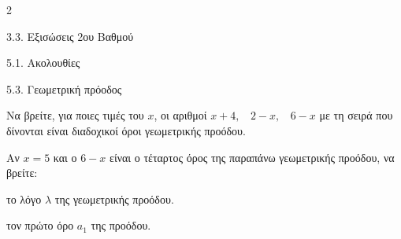 \begin{ylh}{2}
    \item 3.3. Εξισώσεις 2ου Βαθμού
    \item 5.1. Ακολουθίες
    \item 5.3. Γεωμετρική πρόοδος
\end{ylh}

\begin{alist}
\item Να βρείτε, για ποιες τιμές του $x$, οι αριθμοί $x + 4,\text{ }\ 2 - x,\text{ }\ 6 - x$ με τη σειρά που δίνονται είναι διαδοχικοί όροι γεωμετρικής προόδου.
\item Αν $x = 5$ και ο $6 - x$ είναι ο τέταρτος όρος της παραπάνω γεωμετρικής προόδου, να βρείτε:
\begin{rlist}
\item
  το λόγο $\lambda$ της γεωμετρικής προόδου.
\item
  τον πρώτο όρο $a_{1}$ της προόδου.
\end{rlist}
\end{alist}

